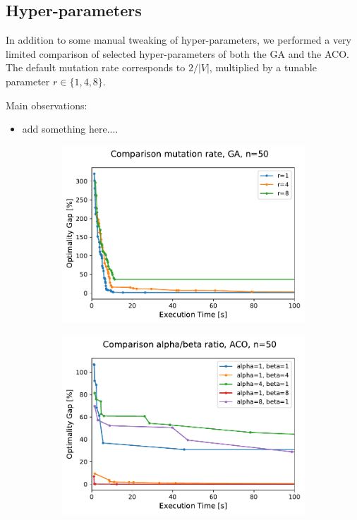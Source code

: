 \documentclass[12pt]{article}
\begin{document}
\subsection{Hyper-parameters}
In addition to some manual tweaking of hyper-parameters, we performed a very limited comparison of selected hyper-parameters of both the GA and the ACO. 
The default mutation rate corresponds to $2/|V|$, multiplied by a tunable parameter $r \in \{1,4,8\}$. 

Main observations:
\begin{itemize}
	\item add something here....
\end{itemize}

 \begin{figure}
        \centering
        \begin{subfigure}[b]{0.475\textwidth}
            \centering
            \includegraphics[width=\textwidth]{figures/ga_50_mutation_rate_comparison.pdf}
            \caption%
            {{\small }}    
            \label{fig:mean and std of net14}
        \end{subfigure}
        \hfill
        \begin{subfigure}[b]{0.475\textwidth}  
            \centering 
            \includegraphics[width=\textwidth]{figures/aco_50_alpha_beta_ratio_comparison.pdf}

\end{subfigure}
\end{figure}
\end{document}
